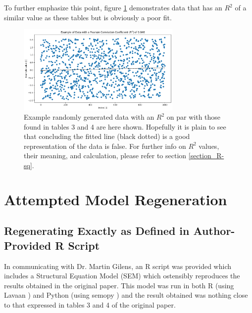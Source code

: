 \documentclass[]{article}
\begin{document}
To further emphasize this point, figure \ref{generated_low_r2} demonstrates data that has an $R^2$ of a similar value as these tables but is obviously a poor fit.
\begin{figure}[H]
	\begin{center}
		\includegraphics[width=300px]{./figures/generated/example-low-r2-plot.png}
	\end{center}	
	\caption{Example randomly generated data with an $R^2$ on par with those found in tables 3 and 4 are here shown. Hopefully it is plain to see that concluding the fitted line (black dotted) is a good representation of the data is false. For further info on $R^2$ values, their meaning, and calculation, please refer to section \ref{section_R-sq}.}
	\label{generated_low_r2}
\end{figure}

\section{Attempted Model Regeneration}
\label{section:model-regen}
\subsection{Regenerating Exactly as Defined in Author-Provided R Script}
In communicating with Dr. Martin Gilens, an R script was provided which includes a Structural Equation Model (SEM) which ostensibly reproduces the results obtained in the original paper.
This model was run in both R (using Lavaan \cite{lavaan}) and Python (using semopy \cite{semopy}) and the result obtained was nothing close to that expressed in tables 3 and 4 of the original paper.
\end{document}
